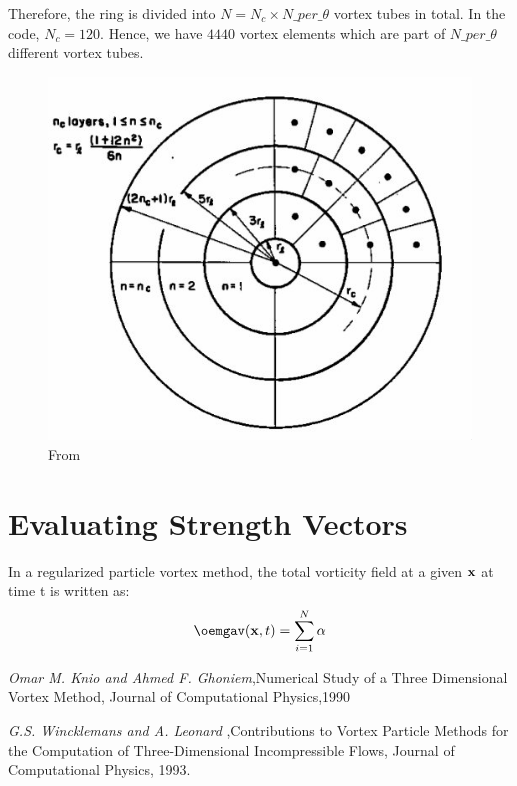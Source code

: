 \documentclass[10pt,a4paper]{report}
\newcommand{\xv}{{\bf x}}
\newcommand{\alphav}{{\bf \alpha}}
\begin{document}
Therefore, the ring is divided into $N = N_c \times N\_per\_\theta $ vortex tubes in total. In the code, $N_c = 120$. Hence, we have $4440$ vortex elements which are part of $N\_per\_\theta $ different vortex tubes.

\begin{figure}
\includegraphics[scale=0.4]{discrete.jpg}
\caption{From \cite{wincklemans} }
\end{figure}

\section{Evaluating Strength Vectors}
In a regularized particle vortex method, the total vorticity field at a given $\xv$ at time t is written as:
\begin{equation}
\oemgav(\xv, t) = \sum_{i=1}^N \alphav
\end{equation}








\begin{thebibliography}{3}
\emph{Omar M. Knio and Ahmed F. Ghoniem},Numerical Study of a Three Dimensional Vortex Method,
Journal of Computational Physics,1990

\emph{G.S. Wincklemans and A. Leonard}
,Contributions to Vortex Particle Methods for the Computation of Three-Dimensional Incompressible Flows,
Journal of Computational Physics, 1993.

\end{thebibliography}

 



 
\end{document}
